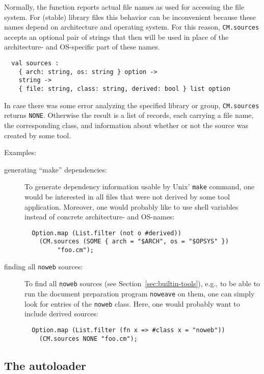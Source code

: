 \documentclass[titlepage,letterpaper]{article}
\begin{document}
Normally, the function reports actual file names as used for accessing
the file system.  For (stable) library files this behavior can be
inconvenient because these names depend on architecture and operating
system.  For this reason, {\tt CM.sources} accepts an optional pair of
strings that then will be used in place of the architecture- and
OS-specific part of these names.

\begin{verbatim}
  val sources :
    { arch: string, os: string } option ->
    string ->
    { file: string, class: string, derived: bool } list option
\end{verbatim}

In case there was some error analyzing the specified library or group,
{\tt CM.sources} returns {\tt NONE}.  Otherwise the result is a list
of records, each carrying a file name, the corresponding class, and
information about whether or not the source was created by some tool.

Examples:

\begin{description}
\item[generating ``make'' dependencies:]
To generate dependency information usable by Unix' {\tt make} command,
one would be interested in all files that were not derived by some
tool application.  Moreover, one would probably like to use shell
variables instead of concrete architecture- and OS-names:
\begin{verbatim}
  Option.map (List.filter (not o #derived))
    (CM.sources (SOME { arch = "$ARCH", os = "$OPSYS" })
         "foo.cm");
\end{verbatim}
\item[finding all {\tt noweb} sources:]
To find all {\tt noweb} sources (see Section~\ref{sec:builtin-tools}),
e.g., to be able to run the document preparation program {\tt noweave}
on them, one can simply look for entries of the {\tt noweb} class.
Here, one would probably want to include derived sources:
\begin{verbatim}
  Option.map (List.filter (fn x => #class x = "noweb"))
    (CM.sources NONE "foo.cm");
\end{verbatim}
\end{description}

\subsection{The autoloader}
\label{sec:autoload}
\end{document}
